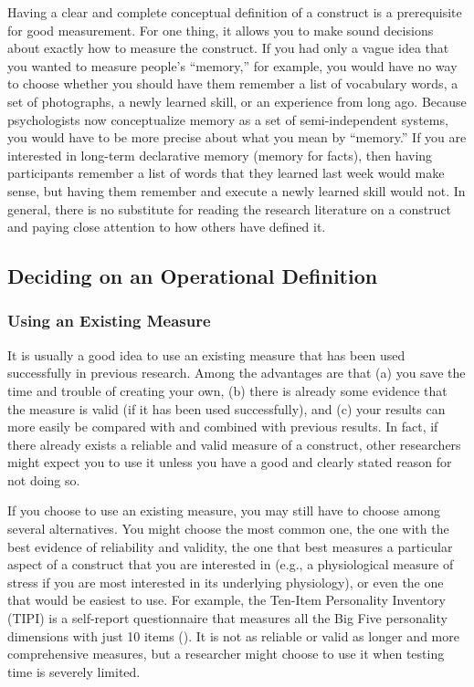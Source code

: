 \documentclass[
]{krantz}
\begin{document}
Having a clear and complete conceptual definition of a construct is a prerequisite for good measurement. For one thing, it allows you to make sound decisions about exactly how to measure the construct. If you had only a vague idea that you wanted to measure people's ``memory,'' for example, you would have no way to choose whether you should have them remember a list of vocabulary words, a set of photographs, a newly learned skill, or an experience from long ago. Because psychologists now conceptualize memory as a set of semi-independent systems, you would have to be more precise about what you mean by ``memory.'' If you are interested in long-term declarative memory (memory for facts), then having participants remember a list of words that they learned last week would make sense, but having them remember and execute a newly learned skill would not. In general, there is no substitute for reading the research literature on a construct and paying close attention to how others have defined it.

\subsection*{Deciding on an Operational Definition}\label{deciding-on-an-operational-definition}


\subsubsection*{Using an Existing Measure}\label{using-an-existing-measure}


It is usually a good idea to use an existing measure that has been used successfully in previous research. Among the advantages are that (a) you save the time and trouble of creating your own, (b) there is already some evidence that the measure is valid (if it has been used successfully), and (c) your results can more easily be compared with and combined with previous results. In fact, if there already exists a reliable and valid measure of a construct, other researchers might expect you to use it unless you have a good and clearly stated reason for not doing so.

If you choose to use an existing measure, you may still have to choose among several alternatives. You might choose the most common one, the one with the best evidence of reliability and validity, the one that best measures a particular aspect of a construct that you are interested in (e.g., a physiological measure of stress if you are most interested in its underlying physiology), or even the one that would be easiest to use. For example, the Ten-Item Personality Inventory (TIPI) is a self-report questionnaire that measures all the Big Five personality dimensions with just 10 items (). It is not as reliable or valid as longer and more comprehensive measures, but a researcher might choose to use it when testing time is severely limited.
\end{document}
